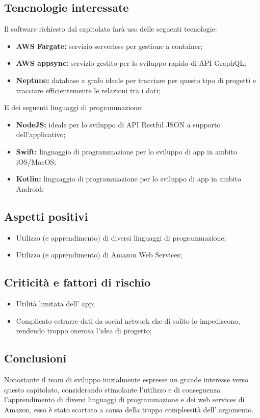 \subsection{Tencnologie interessate}
Il software richiesto dal capitolato farà uso delle seguenti tecnologie:
\begin{itemize}
    \item \textbf{AWS Fargate:} servizio serverless per gestione a container;
    \item \textbf{AWS appsync:} servizio gestito per lo sviluppo rapido di API GraphQL;
    \item \textbf{Neptune:} database a grafo ideale per tracciare per questo tipo di progetti e tracciare efficientemente le relazioni tra i dati;
\end{itemize}
E dei seguenti linguaggi di programmazione:
\begin{itemize}
    \item \textbf{NodeJS:} ideale per lo sviluppo di API Restful JSON a supporto dell’applicativo;
    \item \textbf{Swift:} linguaggio di programmazione per lo sviluppo di app in ambito iOS/MacOS;
    \item \textbf{Kotlin:} linguaggio di programmazione per lo sviluppo di app in ambito Android;
\end{itemize}
\subsection{Aspetti positivi}
\begin{itemize}
    \item Utilizzo (e apprendimento) di diversi linguaggi di programmazione;
    \item Utilizzo (e apprendimento) di Amazon Web Services;
\end{itemize}
\subsection{Criticità e fattori di rischio}
\begin{itemize}
    \item Utilità limitata dell' app;
    \item Complicato estrarre dati da social network che di solito lo impediscono, rendendo troppo onerosa l'idea di progetto;
\end{itemize}
\subsection{Conclusioni}
Nonostante il team di sviluppo inizialmente espresse un grande interesse verso questo capitolato, considerando stimolante l'utilizzo e di conseguenza l'apprendimento di diversi linguaggi di programmazione e dei web services di Amazon, esso è stato scartato a causa della troppa complessità dell' argomento.